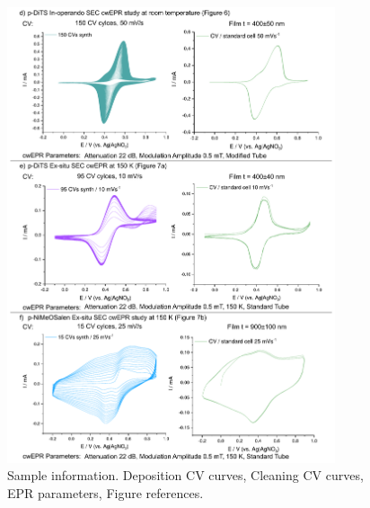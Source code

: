 \begin{figure}[]
\centering
\includegraphics[width=0.86\textwidth]{./electrochemistry/figures/Figure_S3b}
\caption{Sample information. Deposition CV curves, Cleaning CV curves, EPR parameters, Figure references.}
\label{fig:S3}
\end{figure}
